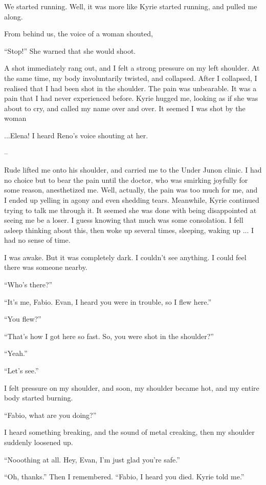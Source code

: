 \documentclass[oneside]{book}
\begin{document}
We started running. Well, it was more like Kyrie started running, and pulled me along.

From behind us, the voice of a woman shouted,

“Stop!” She warned that she would shoot.

A shot immediately rang out, and I felt a strong pressure on my left shoulder. At the same time, my body involuntarily twisted, and collapsed. After I collapsed, I realised that I had been shot in the shoulder. The pain was unbearable. It was a pain that I had never experienced before. Kyrie hugged me, looking as if she was about to cry, and called my name over and over. It seemed I was shot by the woman

...Elena! I heard Reno’s voice shouting at her.

–

Rude lifted me onto his shoulder, and carried me to the Under Junon clinic. I had no choice but to bear the pain until the doctor, who was smirking joyfully for some reason, anesthetized me. Well, actually, the pain was too much for me, and I ended up yelling in agony and even shedding tears. Meanwhile, Kyrie continued trying to talk me through it. It seemed she was done with being disappointed at seeing me be a loser. I guess knowing that much was some consolation. I fell asleep thinking about this, then woke up several times, sleeping, waking up ... I had no sense of time.

I was awake. But it was completely dark. I couldn’t see anything. I could feel there was someone nearby.

“Who’s there?”

“It’s me, Fabio. Evan, I heard you were in trouble, so I flew here.”

“You flew?”

“That’s how I got here so fast. So, you were shot in the shoulder?”

“Yeah.”

“Let’s see.”

I felt pressure on my shoulder, and soon, my shoulder became hot, and my entire body started burning.

“Fabio, what are you doing?”

I heard something breaking, and the sound of metal creaking, then my shoulder suddenly loosened up.

“Nooothing at all. Hey, Evan, I’m just glad you’re safe.”

“Oh, thanks.” Then I remembered. “Fabio, I heard you died. Kyrie told me.”
\end{document}
